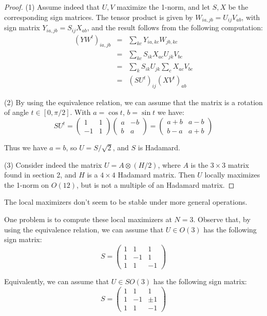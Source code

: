 \documentclass[12pt]{amsart}
\begin{document}
\begin{proof}
(1) Assume indeed that $U,V$ maximize the 1-norm, and let $S,X$ be the corresponding sign matrices. The tensor product is given by $W_{ia,jb}=U_{ij}V_{ab}$, with sign matrix $Y_{ia,jb}=S_{ij}X_{ab}$, and the result follows from the following computation:
\begin{eqnarray*}
(YW^t)_{ia,jb}
&=&\sum_{kc}Y_{ia,kc}W_{jb,kc}\\
&=&\sum_{kc}S_{ik}X_{ac}U_{jk}V_{bc}\\
&=&\sum_kS_{ik}U_{jk}\sum_cX_{ac}V_{bc}\\
&=&(SU^t)_{ij}(XV^t)_{ab}
\end{eqnarray*}

(2) By using the equivalence relation, we can assume that the matrix is a rotation of angle $t\in [0,\pi/2]$. With $a=\cos t$, $b=\sin t$ we have:
$$SU^t=\begin{pmatrix}1&1\\ -1&1\end{pmatrix}
\begin{pmatrix}a&-b\\ b&a\end{pmatrix}
=\begin{pmatrix}a+b&a-b\\ b-a&a+b\end{pmatrix}$$

Thus we have $a=b$, so $U=S/\sqrt{2}$, and $S$ is Hadamard.

(3) Consider indeed the matrix $U=A\otimes(H/2)$, where $A$ is the $3\times 3$ matrix found in section 2, and $H$ is a $4\times 4$ Hadamard matrix. Then $U$ locally maximizes the 1-norm on $O(12)$, but is not a multiple of an Hadamard matrix. 
\end{proof}

The local maximizers don't seem to be stable under more general operations.

One problem is to compute these local maximizers at $N=3$. Observe that, by using the equivalence relation, we can assume that $U\in O(3)$ has the following sign matrix:
$$S=\begin{pmatrix}1&1&1\\ 1&-1&1\\ 1&1&-1\end{pmatrix}$$

Equivalently, we can assume that $U\in SO(3)$ has the following sign matrix:
$$S=\begin{pmatrix}1&1&1\\ 1&-1&\pm 1\\ 1&1&-1\end{pmatrix}$$
\end{document}
